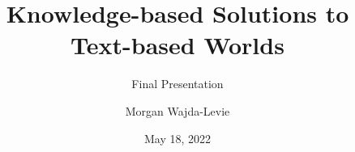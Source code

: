\documentclass{beamer}
\title{Knowledge-based Solutions to Text-based Worlds}
\subtitle{Final Presentation}
\author{Morgan Wajda-Levie}
\date{May 18, 2022}
\begin{document}
\begin{frame}
    \titlepage
\end{frame}










\end{document}
